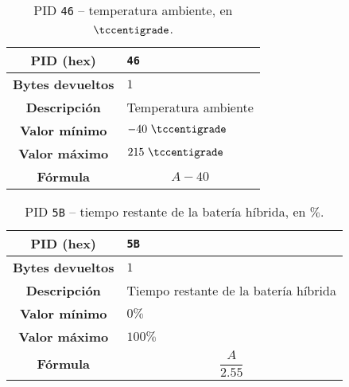 \begin{table}[H]
  \centering
  \begin{tabularx}{\textwidth}{|c|X|}
    \hline
    \textbf{PID (hex)}       & \texttt{46}          \\
    \hline
    \textbf{Bytes devueltos} & $1$                  \\
    \hline
    \textbf{Descripción}     & Temperatura ambiente \\
    \hline
    \textbf{Valor mínimo}    & $-40~\tccentigrade$  \\
    \hline
    \textbf{Valor máximo}    & $215~\tccentigrade$  \\
    \hline
    \textbf{Fórmula}         &                      %
    \begin{equation*}
      A - 40
    \end{equation*}                      \\
    \hline
  \end{tabularx}
  \caption{\ac{PID} \texttt{46} -- temperatura ambiente, en $\tccentigrade$.}
\end{table}

\begin{table}[H]
  \centering
  \begin{tabularx}{\textwidth}{|c|X|}
    \hline
    \textbf{PID (hex)}       & \texttt{5B}                           \\
    \hline
    \textbf{Bytes devueltos} & $1$                                   \\
    \hline
    \textbf{Descripción}     & Tiempo restante de la batería híbrida \\
    \hline
    \textbf{Valor mínimo}    & $0\%$                                 \\
    \hline
    \textbf{Valor máximo}    & $100\%$                               \\
    \hline
    \textbf{Fórmula}         &                                       %
    \begin{equation*}
      \frac{A}{2.55}
    \end{equation*}                                       \\
    \hline
  \end{tabularx}
  \caption{\ac{PID} \texttt{5B} -- tiempo restante de la batería híbrida, en $\%$.}
\end{table}

